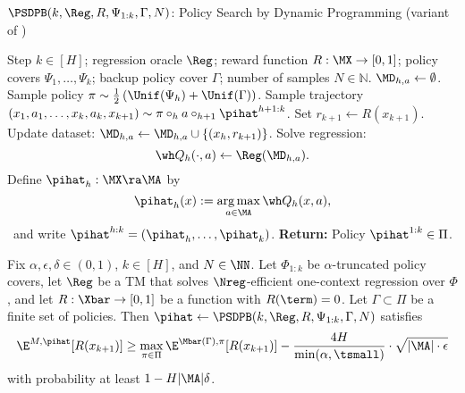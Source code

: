 \begin{algorithm}[t]
	\caption{$\PSDPB(k, \Reg, R, \Psi_{1:k}, \Gamma, N)$: Policy Search by Dynamic Programming (variant of \cite{bagnell2003policy})}
	\label{alg:psdpb}
	\begin{algorithmic}[1]\onehalfspacing
		\Require Step $k \in [H]$; regression oracle $\Reg$; reward function $R: \MX \to [0,1]$; policy covers $\Psi_1, \ldots, \Psi_{k}$; backup policy cover $\Gamma$; number of samples $N\in \mathbb{N}$.
    		\State $\MD_{h,a} \gets\emptyset$.
            \State Sample policy $\pi \sim \frac{1}{2}\left(\Unif(\Psi_h) + \Unif(\Gamma)\right)$.
    		\State Sample trajectory $(x_1, a_1, \dots, x_k, a_k, x_{k+1})\sim
    		\pi \circ_h a \circ_{h+1} \pihat^{h+1:k}$.
            \State Set $r_{k+1} \gets R(x_{k+1})$.
    		\State Update dataset: $\MD_{h,a} \gets \MD_{h,a} \cup \{ (x_h, r_{k+1})\}$.
    		\EndFor
    		\State Solve regression:
		\[\wh Q_h(\cdot,a) \gets \Reg(\MD_{h,a}).\] \label{eq:psdp-mistake}
        \EndFor
		\State\label{line:pihat-def} Define $\pihat_h : \MX \ra \MA$ by
		\[
		\pihat_h(x)  := 
			\argmax_{a\in \MA} \wh Q_h(x,a),
          \] 
          \quad\, and write $\pihat^{h:k} = (\pihat_h, \ldots, \pihat_k)$. 
		\EndFor
		\State \textbf{Return:} Policy $\pihat^{1:k} \in \Pi$. 
	\end{algorithmic}
\end{algorithm}

\begin{lemma}\label{lemma:psdp-trunc-online}
Fix $\alpha,\epsilon,\delta \in (0,1)$, $k \in [H]$, and $N \in \NN$. Let $\Phi_{1:k}$ be $\alpha$-truncated policy covers, let $\Reg$ be a TM that solves $\Nreg$-efficient one-context regression over $\Phi$, and let $R: \Xbar\to[0,1]$ be a function with $R(\term)=0$. Let $\Gamma \subset \Pi$ be a finite set of policies. Then $\pihat \gets \PSDPB(k,\Reg,R,\Psi_{1:k},\Gamma,N)$ satisfies
\[\E^{M,\pihat}[R(x_{k+1})] \geq \max_{\pi\in\Pi} \E^{\Mbar(\Gamma),\pi}[R(x_{k+1})] - \frac{4H}{\min(\alpha,\tsmall)} \cdot \sqrt{|\MA| \cdot \epsilon}\]
with probability at least $1 - H|\MA|\delta$.
\end{lemma}

\fi
